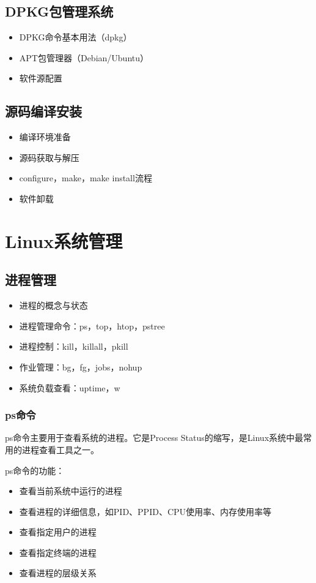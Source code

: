 \documentclass[12pt,UTF8]{ctexbook}
\begin{document}
\section{DPKG包管理系统}
\begin{itemize}
    \item DPKG命令基本用法（dpkg）
    \item APT包管理器（Debian/Ubuntu）
    \item 软件源配置
\end{itemize}

\section{源码编译安装}
\begin{itemize}
    \item 编译环境准备
    \item 源码获取与解压
    \item configure，make，make install流程
    \item 软件卸载
\end{itemize}

\chapter{Linux系统管理}

\section{进程管理}
\begin{itemize}
    \item 进程的概念与状态
    \item 进程管理命令：ps，top，htop，pstree
    \item 进程控制：kill，killall，pkill
    \item 作业管理：bg，fg，jobs，nohup
    \item 系统负载查看：uptime，w
\end{itemize}

\subsection{ps命令}
ps命令主要用于查看系统的进程。它是Process Status的缩写，是Linux系统中最常用的进程查看工具之一。

ps命令的功能：
\begin{itemize}
    \item 查看当前系统中运行的进程
    \item 查看进程的详细信息，如PID、PPID、CPU使用率、内存使用率等
    \item 查看指定用户的进程
    \item 查看指定终端的进程
    \item 查看进程的层级关系
\end{itemize}
\end{document}
